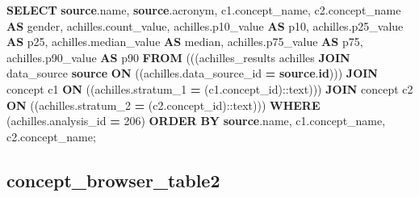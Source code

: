 \documentclass[
]{book}
\newenvironment{Shaded}{\begin{snugshade}}{\end{snugshade}}
\newcommand{\CharTok}[1]{\textcolor[rgb]{0.31,0.60,0.02}{#1}}
\newcommand{\DecValTok}[1]{\textcolor[rgb]{0.00,0.00,0.81}{#1}}
\newcommand{\FunctionTok}[1]{\textcolor[rgb]{0.00,0.00,0.00}{#1}}
\newcommand{\KeywordTok}[1]{\textcolor[rgb]{0.13,0.29,0.53}{\textbf{#1}}}
\newcommand{\NormalTok}[1]{#1}
\newcommand{\OperatorTok}[1]{\textcolor[rgb]{0.81,0.36,0.00}{\textbf{#1}}}
\begin{document}
\begin{Shaded}
\begin{Highlighting}[]
\KeywordTok{SELECT} \KeywordTok{source}\NormalTok{.name,}
   \KeywordTok{source}\NormalTok{.acronym,}
\NormalTok{   c1.concept\_name,}
\NormalTok{   c2.concept\_name }\KeywordTok{AS}\NormalTok{ gender,}
\NormalTok{   achilles.count\_value,}
\NormalTok{   achilles.p10\_value }\KeywordTok{AS}\NormalTok{ p10,}
\NormalTok{   achilles.p25\_value }\KeywordTok{AS}\NormalTok{ p25,}
\NormalTok{   achilles.median\_value }\KeywordTok{AS} \FunctionTok{median}\NormalTok{,}
\NormalTok{   achilles.p75\_value }\KeywordTok{AS}\NormalTok{ p75,}
\NormalTok{   achilles.p90\_value }\KeywordTok{AS}\NormalTok{ p90}
  \KeywordTok{FROM}\NormalTok{ (((achilles\_results achilles}
    \KeywordTok{JOIN}\NormalTok{ data\_source }\KeywordTok{source}
      \KeywordTok{ON}\NormalTok{ ((achilles.data\_source\_id }\OperatorTok{=} \KeywordTok{source}\NormalTok{.}\KeywordTok{id}\NormalTok{)))}
    \KeywordTok{JOIN}\NormalTok{ concept c1}
      \KeywordTok{ON}\NormalTok{ ((achilles.stratum\_1 }\OperatorTok{=}\NormalTok{ (c1.concept\_id):}\CharTok{:text}\NormalTok{)))}
    \KeywordTok{JOIN}\NormalTok{ concept c2}
      \KeywordTok{ON}\NormalTok{ ((achilles.stratum\_2 }\OperatorTok{=}\NormalTok{ (c2.concept\_id):}\CharTok{:text}\NormalTok{)))}
 \KeywordTok{WHERE}\NormalTok{ (achilles.analysis\_id }\OperatorTok{=} \DecValTok{206}\NormalTok{)}
 \KeywordTok{ORDER} \KeywordTok{BY} \KeywordTok{source}\NormalTok{.name, c1.concept\_name, c2.concept\_name;}
\end{Highlighting}
\end{Shaded}

\hypertarget{concept_browser_table2}{%
\subsection*{concept\_browser\_table2}\label{concept_browser_table2}}
\end{document}
